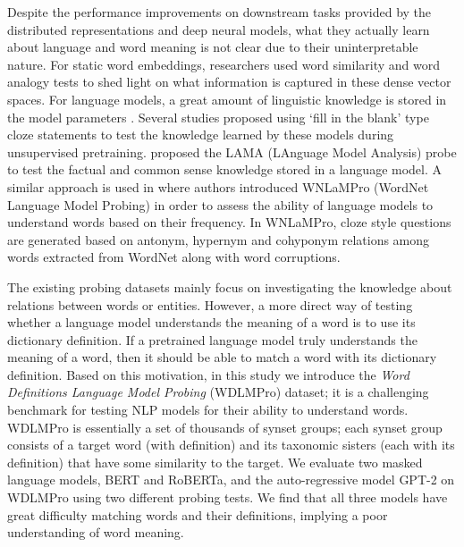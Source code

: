 \documentclass[11pt,a4paper]{article}
\begin{document}

Despite the performance improvements on downstream tasks
provided by the distributed representations and deep neural
models, what they actually learn about language and word meaning  is not clear due to their uninterpretable nature. For static word embeddings, researchers used word similarity \cite{hill15simlex} and word analogy \cite{gladkova16analogy} tests to shed light on what information is captured in these dense vector spaces. For language models, a great amount of linguistic knowledge is stored in the model parameters \cite{peters18dissecting}.  Several studies proposed using `fill in the blank' type cloze statements to test the knowledge learned by these models during unsupervised pretraining.  proposed the LAMA (LAnguage Model Analysis) probe to test the factual and common sense knowledge stored in a language model. A similar approach is used in \cite{Schick20rareWords} where authors introduced WNLaMPro (WordNet Language Model Probing) in order to assess the ability of language models to understand words based on their frequency. In WNLaMPro, cloze style questions are generated based on antonym, hypernym and cohyponym relations among words extracted from WordNet along with word corruptions.

The existing probing datasets mainly focus on investigating
the knowledge about relations between words or
entities. However, a more direct way of testing whether a
language model understands the meaning of a word is to
use its dictionary definition. If a pretrained
language model truly understands the meaning of a word, then
it should be able to
match a word with its dictionary definition. 
Based on this motivation, in
this study we introduce the \textit{Word Definitions Language
  Model Probing} (WDLMPro) dataset; it is a challenging
benchmark for testing NLP models for their ability to
understand words.
WDLMPro is essentially a set of
thousands of synset groups; each synset group consists
of a target word (with definition) and its taxonomic sisters
(each with its definition) that have some similarity to the target.
We evaluate two masked language models, BERT and
RoBERTa, and the auto-regressive model GPT-2 on WDLMPro using two different probing tests.
We find that all three models have great difficulty matching
words and their definitions, implying a poor understanding
of word meaning.

\end{document}
